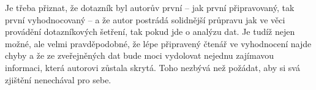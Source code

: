 \documentclass[12pt, a4paper, twoside]{article}
\begin{document}
Je třeba přiznat, že dotazník byl autorův první -- jak první
připravovaný, tak první vyhodnocovaný -- a že autor postrádá
solidnější průpravu jak ve věci provádění dotazníkových šetření,
tak pokud jde o analýzu dat. Je tudíž nejen možné, ale velmi
pravděpodobné, že lépe připravený čtenář ve vyhodnocení najde chyby
a že ze zveřejněných dat bude moci vydolovat nejednu zajímavou
informaci, která autorovi zůstala skrytá.
Toho nezbývá než požádat, aby si svá zjištění nenechával pro sebe.

\tableofcontents
\end{document}
